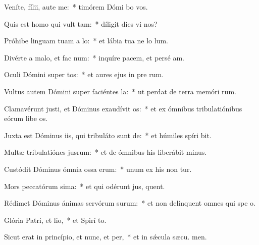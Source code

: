 \item Veníte, fílii, aute me:~* timórem Dómi bo vos.
\item Quis est homo qui vult tam:~* díligit dies vi nos?
\item Próhibe linguam tuam a lo:~* et lábia tua ne lo lum.
\item Divérte a malo, et fac num:~* inquíre pacem, et persé am.
\item Oculi Dómini super tos:~* et aures ejus in pre rum.
\item Vultus autem Dómini super faciéntes la:~* ut perdat de terra memóri rum.
\item Clamavérunt justi, et Dóminus exaudívit os:~* et ex ómnibus tribulatiónibus eórum libe os.
\item Juxta est Dóminus iis, qui tribuláto sunt de:~* et húmiles spíri bit.
\item Multæ tribulatiónes jusrum:~* et de ómnibus his liberábit  minus.
\item Custódit Dóminus ómnia ossa erum:~* unum ex his non tur.
\item Mors peccatórum sima:~* et qui odérunt jus, quent.
\item Rédimet Dóminus ánimas servórum surum:~* et non delínquent omnes qui spe  o.
\item Glória Patri, et lio,~* et Spirí to.
\item Sicut erat in princípio, et nunc, et per,~* et in sǽcula sæcu. men.
